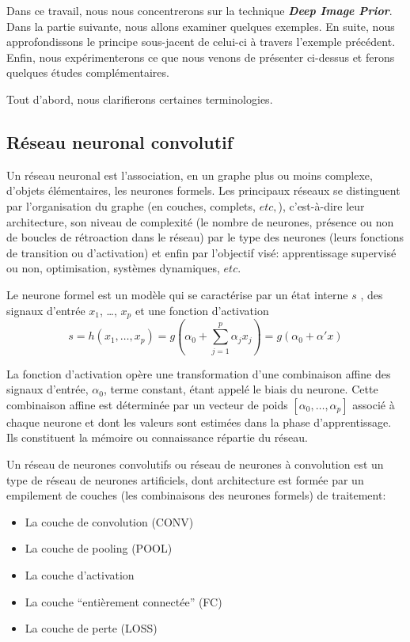 \documentclass[
  11pt,
  dvipsnames]{article}
\providecommand{\tightlist}{%
  \setlength{\itemsep}{0pt}\setlength{\parskip}{0pt}}
\begin{document}
Dans ce travail, nous nous concentrerons sur la technique \textbf{\emph{Deep Image Prior}}.
Dans la partie suivante, nous allons examiner quelques exemples.
En suite, nous approfondissons le principe sous-jacent de celui-ci à travers l'exemple précédent.
Enfin, nous expérimenterons ce que nous venons de présenter ci-dessus
et ferons quelques études complémentaires.

Tout d'abord, nous clarifierons certaines terminologies.

\hypertarget{ruxe9seau-neuronal-convolutif}{%
\subsection{Réseau neuronal convolutif}\label{ruxe9seau-neuronal-convolutif}}

Un réseau neuronal est l'association, en un graphe plus ou moins complexe,
d'objets élémentaires, les neurones formels.
Les principaux réseaux se distinguent par l'organisation du graphe (en couches, complets, \(etc,\)),
c'est-à-dire leur architecture, son niveau de complexité
(le nombre de neurones, présence ou non de boucles de rétroaction dans le réseau)
par le type des neurones (leurs fonctions de transition ou d'activation)
et enfin par l'objectif visé: apprentissage supervisé ou non, optimisation,
systèmes dynamiques, \(etc.\)

Le neurone formel est un modèle qui se caractérise par
un état interne \(s\) , des signaux d'entrée \(x_{1}\), \dots, \(x_{p}\) et une fonction d'activation
\[ s=h(x_{1},\dots,x_{p})=g(\alpha_{0} + \sum_{j=1}^{p} \alpha_{j}x_{j}) = g(\alpha_{0} + \alpha' x)\]

La fonction d'activation opère une transformation d'une combinaison affine
des signaux d'entrée, \(\alpha_{0}\), terme constant, étant appelé le biais du neurone.
Cette combinaison affine est déterminée par un vecteur de poids
\([\alpha_{0},\dots,\alpha_{p}]\) associé à chaque neurone et dont les valeurs sont estimées dans la phase d'apprentissage. Ils constituent la mémoire ou connaissance répartie du réseau.

Un réseau de neurones convolutifs ou réseau de neurones à convolution
est un type de réseau de neurones artificiels, dont architecture est formée par
un empilement de couches (les combinaisons des neurones formels) de traitement:

\begin{itemize}
\tightlist
\item
  La couche de convolution (CONV)
\item
  La couche de pooling (POOL)
\item
  La couche d'activation
\item
  La couche ``entièrement connectée'' (FC)
\item
  La couche de perte (LOSS)
\end{itemize}
\end{document}
